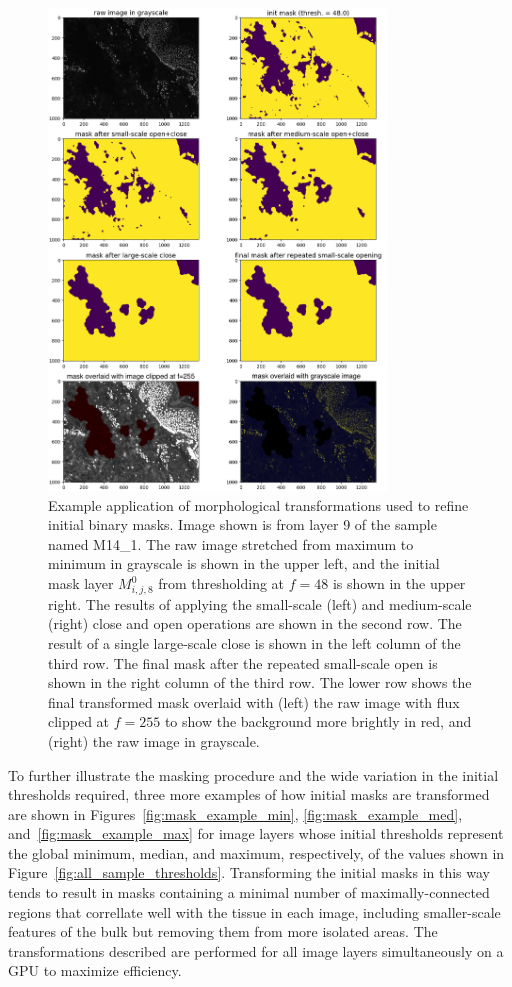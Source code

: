 \documentclass[letterpaper,11pt]{article}
\newcommand{\reffig}[1]{Figure~\ref{#1}}
\begin{document}
\begin{figure}[!ht]
\centering
\includegraphics[width=0.80\textwidth]{images/masking/image_286_layer_9_masks}
\caption{\footnotesize Example application of morphological transformations used to refine initial binary masks. Image shown is from layer 9 of the sample named M14\_1. The raw image stretched from maximum to minimum in grayscale is shown in the upper left, and the initial mask layer $M^{0}_{i,j,8}$ from thresholding at $f=48$ is shown in the upper right. The results of applying the small-scale (left) and medium-scale (right) close and open operations are shown in the second row. The result of a single large-scale close is shown in the left column of the third row. The final mask after the repeated small-scale open is shown in the right column of the third row. The lower row shows the final transformed mask overlaid with (left) the raw image with flux clipped at $f=255$ to show the background more brightly in red, and (right) the raw image in grayscale.}
\label{fig:morphological_transformations}
\end{figure}

To further illustrate the masking procedure and the wide variation in the initial thresholds required, three more examples of how initial masks are transformed are shown in Figures~\ref{fig:mask_example_min}, \ref{fig:mask_example_med}, and~\ref{fig:mask_example_max} for image layers whose initial thresholds represent the global minimum, median, and maximum, respectively, of the values shown in \reffig{fig:all_sample_thresholds}. Transforming the initial masks in this way tends to result in masks containing a minimal number of maximally-connected regions that correllate well with the tissue in each image, including smaller-scale features of the bulk but removing them from more isolated areas. The transformations described are performed for all image layers simultaneously on a GPU to maximize efficiency. 
\end{document}
